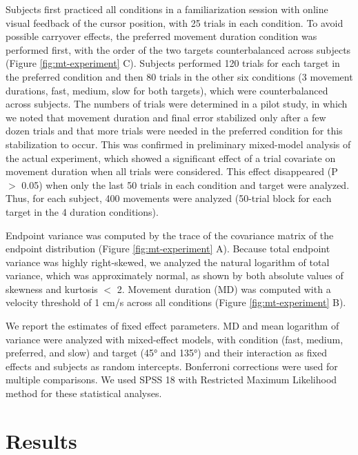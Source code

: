 Subjects first practiced all conditions in a familiarization session with online visual feedback of the cursor position, with 25 trials in each condition. 
To avoid possible carryover effects, the preferred movement duration condition was performed first, with the order of the two targets counterbalanced across subjects (Figure \ref{fig:mt-experiment} C). 
Subjects performed 120 trials for each target in the preferred condition and then 80 trials in the other six conditions (3 movement durations, fast, medium, slow for both targets), which were counterbalanced across subjects. 
The numbers of trials were determined in a pilot study, in which we noted that movement duration and final error stabilized only after a few dozen trials and that more trials were needed in the preferred condition for this stabilization to occur. 
This was confirmed in preliminary mixed-model analysis of the actual experiment, which showed a significant effect of a trial covariate on movement duration when all trials were considered. This effect disappeared (P $>$ 0.05) when only the last 50 trials in each condition and target were analyzed. Thus, for each subject, 400 movements were analyzed (50-trial block for each target in the 4 duration conditions).

Endpoint variance was computed by the trace of the covariance matrix of the endpoint distribution (Figure \ref{fig:mt-experiment} A). Because total endpoint variance was highly right-skewed, we analyzed the natural logarithm of total variance, which was approximately normal, as shown by both absolute values of skewness and kurtosis $<$ 2. Movement duration (MD) was computed with a velocity threshold of 1 cm/s across all conditions (Figure \ref{fig:mt-experiment} B).

We report the estimates of fixed effect parameters. MD and mean logarithm of variance were analyzed with mixed-effect models, with condition (fast, medium, preferred, and slow) and target (\ang{45} and \ang{135}) and their interaction as fixed effects and subjects as random intercepts. Bonferroni corrections were used for multiple comparisons. We used SPSS 18 with Restricted Maximum Likelihood method for these statistical analyses.

\section{Results}

